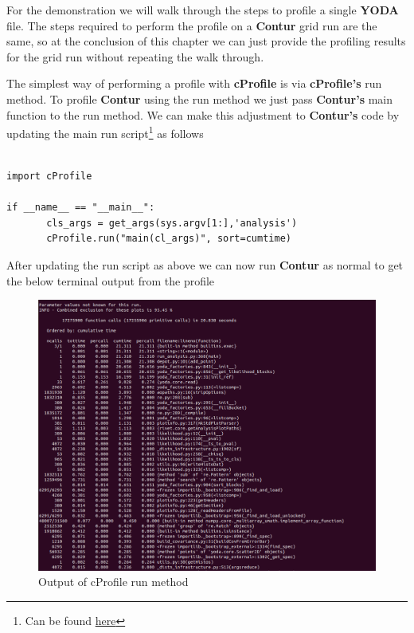 For the demonstration we will walk through the steps to profile a single \textbf{YODA} file. The steps required to perform the profile on a \textbf{Contur} grid run are the same, so at the conclusion of this chapter we can just provide the profiling results for the grid run without repeating the walk through.

The simplest way of performing a profile with \textbf{cProfile} is via \textbf{cProfile's} run method. To profile \textbf{Contur} using the run method we just pass \textbf{Contur's} main function to the run method. We can make this adjustment to \textbf{Contur's} code by updating the main run script\footnote{Can be found \href{https://gitlab.com/hepcedar/contur/-/blob/main/bin/contur}{here}} as follows 

\begin{verbatim}

import cProfile

if __name__ == "__main__":
       cls_args = get_args(sys.argv[1:],'analysis')
       cProfile.run("main(cl_args)", sort=cumtime)

\end{verbatim}


After updating the run script as above we can now run \textbf{Contur} as normal to get the below terminal output from the profile

\begin{figure}[H]
\centering
\includegraphics[scale=0.35]{plots/example_profile.png}
\caption{Output of cProfile run method}
\label{fig:ep}
\end{figure}

